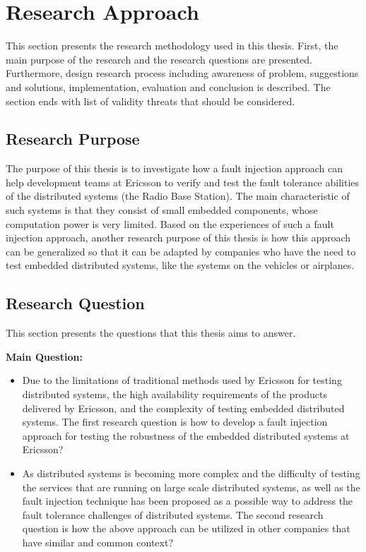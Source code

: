 \section{Research Approach}
This section presents the research methodology used in this thesis. First, the main purpose of the research and the research questions are presented. Furthermore, design research process including awareness of problem, suggestions and solutions, implementation, evaluation and conclusion is described. The section ends with list of validity threats that should be considered.  

\subsection{Research Purpose}
The purpose of this thesis is to investigate how a fault injection approach can help development teams at Ericsson to verify and test the fault tolerance abilities of the distributed systems (the Radio Base Station). The main characteristic of such systems is that they consist of small embedded components, whose computation power is very limited. Based on the experiences of such a fault injection approach, another research purpose of this thesis is how this approach can be generalized so that it can be adapted by companies who have the need to test embedded distributed systems, like the systems on the vehicles or airplanes.

\subsection{Research Question}
This section presents the questions that this thesis aims to answer.

\begin{description}
\item {\textbf{Main Question:}} 
\begin{itemize}
  
  \item Due to the limitations of traditional methods used by Ericsson for testing distributed systems, the high availability requirements of the products delivered by Ericsson, and the complexity of testing embedded distributed systems. The first research question is how to develop a fault injection approach for testing the robustness of the embedded distributed systems at Ericsson?
  
  \item As distributed systems is becoming more complex and the difficulty of testing the services that are running on large scale distributed systems, as well as the fault injection technique has been proposed as a possible way to address the fault tolerance challenges of distributed systems. The second research question is how the above approach can be utilized in other companies that have similar and common context? 
  
  \end{itemize}
  

\end{description}

